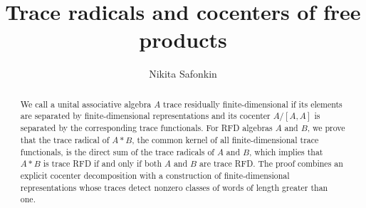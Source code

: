 \documentclass[10pt,oneside,reqno]{amsart}
\title{Trace radicals and cocenters of free products}
\date{}
\author{Nikita Safonkin}
\theoremstyle{definition}
\numberwithin{theorem}{section}
\numberwithin{equation}{section}
\begin{document}
\begin{abstract}
    We call a unital associative algebra \(A\) trace residually finite-dimensional if its elements are separated by finite-dimensional representations and its cocenter \(A/[A,A]\) is separated by the corresponding trace functionals.
    For RFD algebras \(A\) and \(B\), we prove that the trace radical of \(A*B\), the common kernel of all finite-dimensional trace functionals, is the direct sum of the trace radicals of \(A\) and \(B\), which implies that \(A*B\) is trace RFD if and only if both \(A\) and \(B\) are trace RFD.
    The proof combines an explicit cocenter decomposition with a construction of finite-dimensional representations whose traces detect nonzero classes of words of length greater than one.
\end{abstract}

\maketitle



\printbibliography
\end{document}
